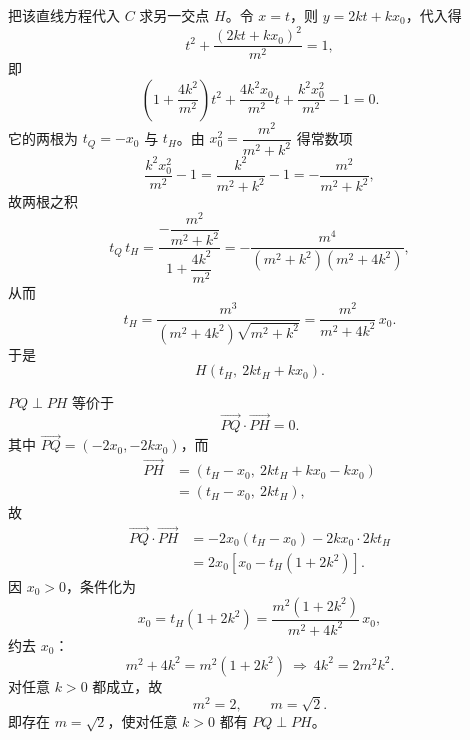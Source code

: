 \begin{answer}
把该直线方程代入 $C$ 求另一交点 $H$。令 $x=t$，则 $y=2kt+kx_0$，代入得
\nopagebreak[4]
\[t^2+\frac{(2kt+kx_0)^2}{m^2}=1,\]
即
\nopagebreak[4]
\[\left(1+\frac{4k^2}{m^2}\right)t^2+\frac{4k^2x_0}{m^2}t+\frac{k^2x_0^2}{m^2}-1=0.\]
它的两根为 $t_Q=-x_0$ 与 $t_H$。由 $x_0^2=\dfrac{m^2}{m^2+k^2}$ 得常数项
\nopagebreak[4]
\[\frac{k^2x_0^2}{m^2}-1=\frac{k^2}{m^2+k^2}-1=-\frac{m^2}{m^2+k^2},\]
故两根之积
\nopagebreak[4]
\[t_Q\,t_H=\frac{-\dfrac{m^2}{m^2+k^2}}{1+\dfrac{4k^2}{m^2}}=-\frac{m^4}{(m^2+k^2)(m^2+4k^2)},\]
从而
\nopagebreak[4]
\[t_H=\frac{m^3}{(m^2+4k^2)\sqrt{m^2+k^2}}=\frac{m^2}{m^2+4k^2}\,x_0.\]
于是
\nopagebreak[4]
\[H\left(t_H,\ 2kt_H+kx_0\right).\]

$PQ\perp PH$ 等价于
\nopagebreak[4]
\[\overrightarrow{PQ}\cdot\overrightarrow{PH}=0.\]
其中 $\overrightarrow{PQ}=(-2x_0,-2kx_0)$，而
\nopagebreak[4]
\[\begin{aligned}
\overrightarrow{PH}&=\left(t_H-x_0,\ 2kt_H+kx_0-kx_0\right)\\
&=\left(t_H-x_0,\ 2kt_H\right),
\end{aligned}\]
故
\nopagebreak[4]
\[\begin{aligned}
\overrightarrow{PQ}\cdot\overrightarrow{PH}
&=-2x_0\left(t_H-x_0\right)-2kx_0\cdot2kt_H\\
&=2x_0\left[x_0-t_H\left(1+2k^2\right)\right].
\end{aligned}\]
因 $x_0>0$，条件化为
\nopagebreak[4]
\[x_0=t_H\left(1+2k^2\right)=\frac{m^2\left(1+2k^2\right)}{m^2+4k^2}\,x_0,\]
约去 $x_0$：
\nopagebreak[4]
\[m^2+4k^2=m^2\left(1+2k^2\right)\ \Longrightarrow\ 4k^2=2m^2k^2.\]
对任意 $k>0$ 都成立，故
\nopagebreak[4]
\[m^2=2,\qquad m=\sqrt2.\]
即存在 $m=\sqrt2$，使对任意 $k>0$ 都有 $PQ\perp PH$。



\end{answer}
